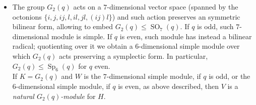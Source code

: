 \documentclass{amsart}
\numberwithin{equation}{section}
\theoremstyle{definition}
\theoremstyle{subresult}
\theoremstyle{caseresult}
\newcommand{\bF}{\mathbb{F}}
\newcommand{\Sp}{\operatorname{Sp}}
\newcommand{\SO}{\operatorname{SO}}
\newcommand{\<}{\langle}
\renewcommand{\>}{\rangle}
\begin{document}
\begin{itemize}
		\item The group $G_2(q)$ acts on a $7$-dimensional vector space (spanned by the octonions $\{i,j,ij,l,il,jl,(ij)l\}$) and such action preserves an symmetric bilinear form, allowing to embed $G_2(q) \le \SO_7(q)$. If $q$ is odd, such $7$-dimensional module is simple. If $q$ is even, such module has instead a bilinear radical; quotienting over it we obtain a $6$-dimensional simple module over which $G_2(q)$ acts preserving a symplectic form. In particular, $G_2(q) \le \Sp_6(q)$ for $q$ even.\\
		If $K=G_2(q)$ and $W$ is the $7$-dimensional simple module, if $q$ is odd, or the $6$-dimensional simple module, if $q$ is even, as above described, then $V$ is a \emph{natural $G_2(q)$-module} for $H$.

\end{itemize}
\end{document}
